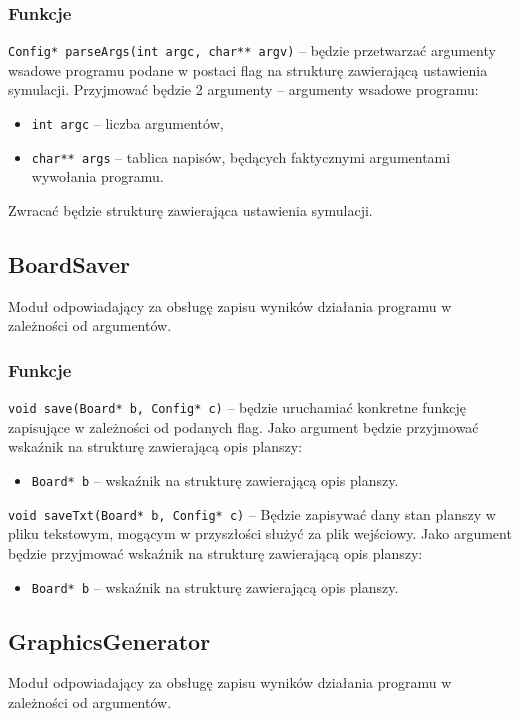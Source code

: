 \documentclass{article}
\begin{document}
\subsubsection{Funkcje}
\texttt{Config* parseArgs(int argc, char** argv)} -- będzie przetwarzać argumenty wsadowe programu podane w postaci flag na strukturę zawierającą ustawienia symulacji. Przyjmować będzie 2 argumenty -- argumenty wsadowe programu:
\begin{itemize}[label={}]
	\item \texttt{int argc} -- liczba argumentów,
	\item \texttt{char** args} -- tablica napisów, będących faktycznymi argumentami wywołania programu.
\end{itemize}

Zwracać będzie strukturę zawierająca ustawienia symulacji.

\subsection{BoardSaver}
Moduł odpowiadający za obsługę zapisu wyników działania programu w zależności od argumentów.

\subsubsection{Funkcje}
\texttt{void save(Board* b, Config* c)} -- będzie uruchamiać konkretne funkcję zapisujące w zależności od podanych flag. Jako argument będzie przyjmować wskaźnik na strukturę zawierającą opis planszy:
\begin{itemize}[label={}]
	\item \texttt{Board* b} -- wskaźnik na strukturę zawierającą opis planszy.
\end{itemize}

\noindent{}\texttt{void saveTxt(Board* b, Config* c)} -- Będzie zapisywać dany stan planszy w pliku tekstowym, mogącym w przyszłości służyć za plik wejściowy. Jako argument będzie przyjmować wskaźnik na strukturę zawierającą opis planszy:
\begin{itemize}[label={}]
	\item \texttt{Board* b} -- wskaźnik na strukturę zawierającą opis planszy.
\end{itemize}

\subsection{GraphicsGenerator}
Moduł odpowiadający za obsługę zapisu wyników działania programu w zależności od argumentów.
\end{document}

